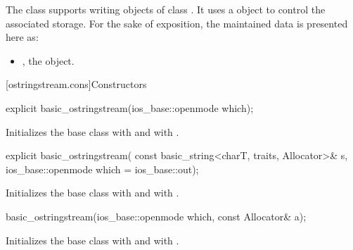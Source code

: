 \pnum
The class
supports writing objects of class
.
It uses a
object to control the associated storage.
For the sake of exposition, the maintained data is presented here as:
\begin{itemize}
\item
{}, the  object.
\end{itemize}

[ostringstream.cons]{Constructors}

%
\begin{itemdecl}
explicit basic_ostringstream(ios_base::openmode which);
\end{itemdecl}

\begin{itemdescr}
\pnum
\effects
Initializes the base class with
and  with
.
\end{itemdescr}

%
\begin{itemdecl}
explicit basic_ostringstream(
  const basic_string<charT, traits, Allocator>& s,
  ios_base::openmode which = ios_base::out);
\end{itemdecl}

\begin{itemdescr}
\pnum
\effects
Initializes the base class with
and  with
\linebreak{}. %
\end{itemdescr}

%
\begin{itemdecl}
basic_ostringstream(ios_base::openmode which, const Allocator& a);
\end{itemdecl}

\begin{itemdescr}
\pnum
\effects
Initializes the base class with
and  with
\linebreak{}. %
\end{itemdescr}

